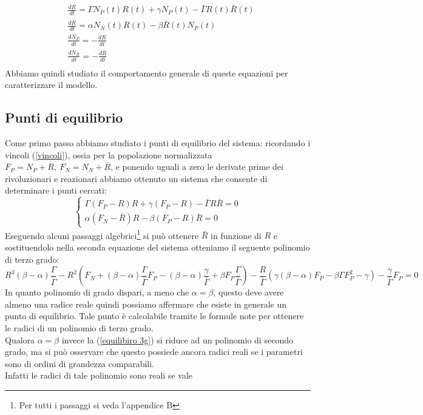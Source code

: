 \begin{equation} \label{eq:1.4}
		\begin{aligned}
			&\frac{dR}{dt}=\Gamma N_P(t) R(t)+\gamma N_P(t)-\bar{\Gamma}R(t)\bar{R}(t)\\
		&\frac{d\bar{R}}{dt}=\alpha N_N(t)R(t)-\beta \bar{R}(t)N_P(t)\\
		&\frac{dN_{P}}{dt}= -\frac{dR}{dt}\\
		&\frac{dN_{R}}{dt}= -\frac{d\bar{R}}{dt}\\
		\end{aligned}
\end{equation}
Abbiamo quindi studiato il comportamento generale di queste equazioni per caratterizzare il modello.
\subsection{Punti di equilibrio}
Come primo passo abbiamo studiato i punti di equilibrio del sistema: ricordando i vincoli (\ref{vincoli}), ossia per la popolazione normalizzata $
	F_{P}=N_{P}+R ,\ F_{N}=N_{N}+\bar{R}
$, e ponendo uguali a zero le derivate prime dei rivoluzionari e reazionari abbiamo ottenuto un sistema che consente di determinare i punti cercati:
\begin{equation}
	\begin{cases}
		\Gamma (F_{P}-R)R+\gamma (F_{P}-R)-\bar{\Gamma}R\bar{R}=0\\
		\alpha (F_{N}-\bar{R})R-\beta (F_{P}-R)\bar{R}=0
	\end{cases}
\end{equation}
Eseguendo alcuni passaggi algebrici\footnote{Per tutti i passaggi si veda l'appendice B} si può ottenere $ \bar{R} $ in funzione di $ R $ e sostituendolo nella seconda equazione del sistema otteniamo il seguente polinomio di terzo grado:
\begin{equation}
	R^{3}(\beta - \alpha)\frac{\Gamma}{\bar{\Gamma}}-R^{2}\left(F_{N}+(\beta - \alpha)\frac{\Gamma}{\bar{\Gamma}}F_{P}-(\beta - \alpha)\frac{\gamma}{\bar{\Gamma}}+\beta F_{P}\frac{\Gamma}{\bar{\Gamma}}\right)-\frac{R}{\bar{\Gamma}}\left(\gamma (\beta - \alpha)F_{P}-\beta \Gamma F^{2}_{P}-\gamma\right)-\frac{\gamma}{\bar{\Gamma}}F_{P}=0
	\label{equilibiro 3g}
\end{equation}
In quanto polinomio di grado dispari, a meno che $\alpha=\beta$, questo deve avere almeno una radice reale quindi possiamo affermare che esiste in generale un punto di equilibrio. Tale punto è calcolabile tramite le formule note per ottenere le radici di un polinomio di terzo grado.\\Qualora $\alpha=\beta$ invece la (\ref{equilibiro 3g}) si riduce ad un polinomio di secondo grado, ma si può osservare che questo possiede ancora radici reali se i parametri sono di ordini di grandezza comparabili. \\Infatti le radici di tale polinomio sono reali se vale

